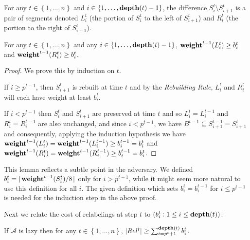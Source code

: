 \documentclass[unicode,review]{siamart1116}
\newcommand{\A}{\mathcal{A}}
\newcommand{\natInt}[2]{ \left\{ #1, \dotsc, #2 \right\} }
\newcommand{\weight}{{\rm {\bf weight}}}
\newcommand{\depth}{{\rm {\bf depth}}}
\numberwithin{theorem}{section}
\begin{document}
For any $t \in \natInt{1}{n}$ and $i \in \natInt{1}{\depth(t)-1}$, the
difference $S^t_i \setminus S^t_{i+1}$ is a pair of segments 
denoted $L^t_i$ (the portion of $S^t_i$ to the left of $S^t_{i+1}$)
and $R^t_i$ (the portion to the right of $S^t_{i+1}$).

\begin{lemma}
\label{l-b}  For  any $t \in \natInt{1}{n}$ and any $i \in \natInt{1}{\depth(t)-1}$, $\weight^{t-1}(L^t_i) \geq b^t_i$
and $\weight^{t-1}(R^t_i) \geq b^t_i$.
\end{lemma}

\begin{proof}
We prove this by induction on $t$.  

If $i \ge  p^{t-1}$, then $S^t_{i+1}$ is rebuilt at time $t$ and by the \emph{Rebuilding Rule},
$L^t_i$ and $R^t_i$ will each have weight at least $b^t_i$.

If $i < p^{t-1}$ then $S^t_i$ and $S^t_{i+1}$ are preserved at time $t$ and so $L^t_i=L^{t-1}_i$ and $R^t_i=R^{t-1}_i$
are also unchanged, and since $i < p^{t-1}$, 
we have $B^{t-1} \subseteq S^{t-1}_{i+1}=S^{t}_{i+1}$
and consequently, applying the induction hypothesis
we have $\weight^{t-1}(L^t_i)=\weight^{t-1}(L^{t-1}_i) \geq b^{t-1}_i=b^t_i$ 
and $\weight^{t-1}(R^t_i)=\weight^{t-1}(R^{t-1}_i) \geq b^{t-1}_i=b^t_i$.  
\end{proof}
   
This lemma reflects a subtle point in the adversary.  We defined $b^t_i=\lceil \weight^{t-1}(S^t_i)/8 \rceil$ only for $i >p^{t-1}$,
while it might seem more natural to use this definition for all $i$. 
The given definition which sets $b^t_i=b^{t-1}_i$ for $i \leq p^{t-1}$ is
needed for the induction step in the above proof.

Next we relate the cost of relabelings at step $t$ to $(b^t_i:1 \leq i \leq \depth(t))$:

\begin{lemma}
\label{l-rel}
If $\A$ is lazy then for any $t \in \natInt{1}{n}$, $|Rel^t| \ge \sum_{i=p^t+1}^{\depth(t)} b^t_i$.
\end{lemma}
\end{document}
